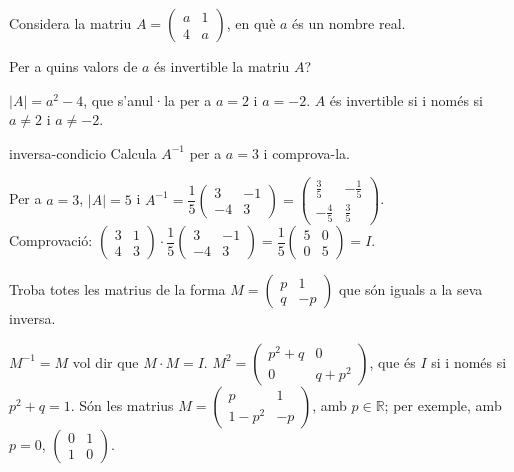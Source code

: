 Considera la matriu $A=\begin{pmatrix}a&1\\4&a\end{pmatrix}$, en què $a$ és un nombre real.

\begin{apartats}

Per a quins valors de $a$ és invertible la matriu $A$?

\begin{solucio}
$|A|=a^2-4$, que s'anul·la per a $a=2$ i $a=-2$. $A$ és invertible si i només si $a\ne2$ i $a\ne-2$.
\end{solucio}

\begin{tria}{inversa-condicio}
Calcula $A^{-1}$ per a $a=3$ i comprova-la.

\begin{solucio}
Per a $a=3$, $|A|=5$ i
$A^{-1}=\dfrac15\begin{pmatrix}3&-1\\-4&3\end{pmatrix}=\begin{pmatrix}\frac35&-\frac15\\[2pt]-\frac45&\frac35\end{pmatrix}$.\\
Comprovació: $\begin{pmatrix}3&1\\4&3\end{pmatrix}\cdot\dfrac15\begin{pmatrix}3&-1\\-4&3\end{pmatrix}
=\dfrac15\begin{pmatrix}5&0\\0&5\end{pmatrix}=I$.
\end{solucio}

Troba totes les matrius de la forma $M=\begin{pmatrix}p&1\\q&-p\end{pmatrix}$ que són iguals a la seva
inversa.

\begin{solucio}
$M^{-1}=M$ vol dir que $M\cdot M=I$.
$M^2=\begin{pmatrix}p^2+q&0\\0&q+p^2\end{pmatrix}$, que és $I$ si i només si $p^2+q=1$. Són les
matrius $M=\begin{pmatrix}p&1\\1-p^2&-p\end{pmatrix}$, amb $p\in\mathbb R$; per exemple, amb $p=0$,
$\begin{pmatrix}0&1\\1&0\end{pmatrix}$.
\end{solucio}
\end{tria}


\end{apartats}
